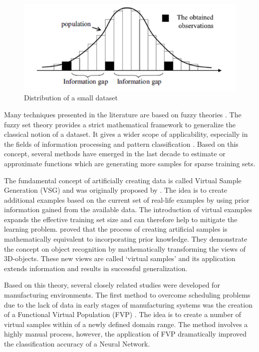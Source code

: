 \documentclass[parskip=full]{scrartcl}
\begin{document}
\begin{figure}[H]
	\centering
	\includegraphics[width=0.6\linewidth]{"./resources/small_data_distribution"}
	\caption{Distribution of a small dataset}
	\label{fig:small-data-distribution}
\end{figure}

Many techniques presented in the literature are based on fuzzy theories
\cite{AbdulLateh.2017}. The fuzzy set theory provides a strict mathematical
framework to generalize the classical notion of a dataset. It gives a wider
scope of applicability, especially in the fields of information processing and
pattern classification \cite{Zimmermann.2010}. Based on this concept, several
methods have emerged in the last decade to estimate or approximate functions
which are generating more samples for sparse training sets.

The fundamental concept of artificially creating data is called Virtual Sample 
Generation (VSG) and was originally proposed by \cite{Niyogi.1998}. The idea is 
to create additional examples based on the current set of real-life examples by 
using prior information gained from the available data. The introduction of 
virtual examples expands the effective training set size and can therefore help 
to mitigate the learning problem. \cite{Niyogi.1998} proved that the process of 
creating artificial samples is mathematically equivalent to incorporating prior 
knowledge. They demonstrate the concept on object recognition by mathematically 
transforming the views of 3D-objects. These new views are called ‘virtual 
samples’ and its application extends information and results in successful 
generalization. 

Based on this theory, several closely related studies were developed for
manufacturing environments. The first method to overcome scheduling problems due
to the lack of data in early stages of manufacturing systems was the creation of
a Functional Virtual Population (FVP) \cite{Li.2003}. The idea is to
create a number of virtual samples within of a newly defined domain range. The
method involves a highly manual process, however, the application of FVP
dramatically improved the classification accuracy of a Neural Network. 
\end{document}

